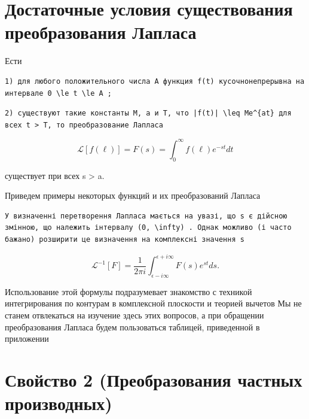 \documentclass[
  ukrainian,
]{article}
\begin{document}
\section{Достаточные условия существования преобразования
Лапласа}\label{ux434ux43eux441ux442ux430ux442ux43eux447ux43dux44bux435-ux443ux441ux43bux43eux432ux438ux44f-ux441ux443ux449ux435ux441ux442ux432ux43eux432ux430ux43dux438ux44f-ux43fux440ux435ux43eux431ux440ux430ux437ux43eux432ux430ux43dux438ux44f-ux43bux430ux43fux43bux430ux441ux430}

Ести

\begin{verbatim}
1) для любого положительного числа A функция f(t) кусочнонепрерывна на интервале 0 \le t \le A ;
\end{verbatim}

\begin{verbatim}
2) существуют такие константы M, a и T, что |f(t)| \leq Me^{at} для всех t > T, то преобразование Лапласа
\end{verbatim}

\[
\mathscr{L}[f(\ell)] = F(s) = \int_{0}^{\infty} f(\ell) e^{-st} dt
\]

существует при всех s \textgreater{} a.

Приведем примеры некоторых функций и их преобразований Лапласа

\begin{verbatim}
У визначенні перетворення Лапласа мається на увазі, що s є дійсною змінною, що належить інтервалу (0, \infty) . Однак можливо (і часто бажано) розширити це визначення на комплексні значення s
\end{verbatim}

\[
\mathscr{L}^{-1}[F] = \frac{1}{2\pi i} \int_{\epsilon - i\infty}^{\epsilon + i\infty} F(s) e^{st} ds.
\]

Использование этой формулы подразумевает знакомство с техникой
интегрирования по контурам в комплексной плоскости и теорией вычетов Мы
не станем отвлекаться на изучение здесь этих вопросов, а при обращении
преобразования Лапласа будем пользоваться таблицей, приведенной в
приложении

\section{Свойство 2 (Преобразования частных
производных)}\label{ux441ux432ux43eux439ux441ux442ux432ux43e-2-ux43fux440ux435ux43eux431ux440ux430ux437ux43eux432ux430ux43dux438ux44f-ux447ux430ux441ux442ux43dux44bux445-ux43fux440ux43eux438ux437ux432ux43eux434ux43dux44bux445}
\end{document}

